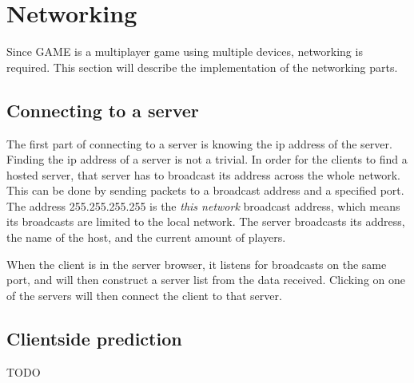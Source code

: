 \section{Networking}
Since GAME is a multiplayer game using multiple devices, networking is required. This section will describe the implementation of the networking parts.

\subsection{Connecting to a server}
The first part of connecting to a server is knowing the ip address of the server.
Finding the ip address of a server is not a trivial.
In order for the clients to find a hosted server, that server has to broadcast its address across the whole network.
This can be done by sending packets to a broadcast address and a specified port.
The address 255.255.255.255 is the \textit{this network} broadcast address, which means its broadcasts are limited to the local network.
The server broadcasts its address, the name of the host, and the current amount of players.

When the client is in the server browser, it listens for broadcasts on the same port, and will then construct a server list from the data received.
Clicking on one of the servers will then connect the client to that server.


\subsection{Clientside prediction}
TODO